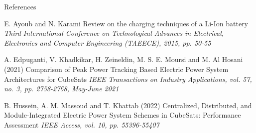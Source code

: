 \documentclass[aspectratio=169]{beamer}
\begin{document}
	
	
	\begin{frame}[allowframebreaks]{References}
	
	\begin{thebibliography}{9}
			
		E. Ayoub and N. Karami 
		\newblock Review on the charging techniques of a Li-Ion battery
		\newblock \emph{Third International Conference on Technological Advances in Electrical, Electronics and Computer Engineering (TAEECE), 2015, pp. 50-55}
		
		A. Edpuganti, V. Khadkikar, H. Zeineldin, M. S. E. Moursi and M. Al Hosani (2021)
		\newblock Comparison of Peak Power Tracking Based Electric Power System Architectures for CubeSats
		\newblock \emph{IEEE Transactions on Industry Applications, vol. 57, no. 3, pp. 2758-2768, May-June 2021}
		
		
	B. Hussein, A. M. Massoud and T. Khattab (2022)
	\newblock Centralized, Distributed, and Module-Integrated Electric Power System Schemes in CubeSats: Performance Assessment
	\newblock \emph{ IEEE Access, vol. 10, pp. 55396-55407}






	\end{thebibliography}
	\end{frame}
	
	\begin{frame}
		
		
	\end{frame}
\end{document}
